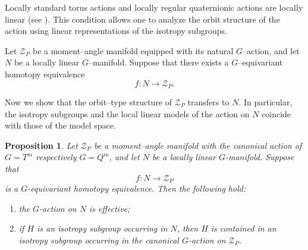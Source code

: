 \documentclass[11pt,a4paper]{article}
\numberwithin{equation}{section}
\newtheorem{prop}[definition]{Proposition}
\theoremstyle{named}
\begin{document}
Locally standard torus actions and locally regular quaternionic actions are locally linear (see \cite{mp,gp}). This condition allows one to analyze the orbit structure of the action using linear representations of the isotropy subgroups.

\medskip
Let $\mathcal Z_P$ be a moment--angle manifold equipped with its natural $G$--action, and let $N$ be a locally linear $G$--manifold. Suppose that there exists a $G$--equivariant homotopy equivalence
\[
f:N\longrightarrow \mathcal Z_P .
\]

Now we show that the orbit--type structure of $\mathcal Z_P$ transfers to $N$. In particular, the isotropy subgroups and the local linear models of the action on $N$ coincide with those of the model space.

\begin{prop}\label{prop:isotropy_transfer}
Let \(\mathcal Z_P\) be a moment--angle manifold with the canonical action of \(G=T^m\) respectively \(G=Q^m\), and let \(N\) be a locally linear \(G\)-manifold. Suppose that
\[
    f:N\longrightarrow \mathcal Z_P
\]
is a \(G\)-equivariant homotopy equivalence. Then the following hold:
\begin{enumerate}
\item[(1)] the \(G\)-action on \(N\) is effective;
\item[(2)] if \(H\) is an isotropy subgroup occurring in \(N\), then \(H\) is contained in an isotropy subgroup occurring in the canonical \(G\)-action on \(\mathcal Z_P\).
\end{enumerate}
\end{prop}
\end{document}
